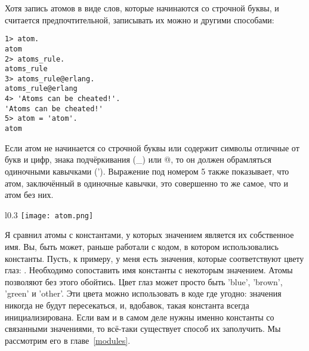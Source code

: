 Хотя запись атомов в виде слов, которые начинаются со строчной буквы, и считается предпочтительной, записывать их можно и другими способами:
\begin{lstlisting}[style=repl]
1> atom.
atom
2> atoms_rule.
atoms_rule
3> atoms_rule@erlang.
atoms_rule@erlang
4> 'Atoms can be cheated!'.
'Atoms can be cheated!'
5> atom = 'atom'.
atom
\end{lstlisting}

Если атом не начинается со строчной буквы или содержит символы отличные от букв и цифр, знака подчёркивания (\_) или @, то он должен обрамляться одиночными кавычками (').
Выражение под номером 5 также показывает, что атом, заключённый в одиночные кавычки, это совершенно то же самое, что и атом без них.

\begin{wrapfigure}{l}{0.3\linewidth}
    \texttt{[image: atom.png]}
\end{wrapfigure}
Я сравнил атомы с константами, у которых значением является их собственное имя.
Вы, быть может, раньше работали с кодом, в котором использовались константы.
Пусть, к примеру, у меня есть значения, которые соответствуют цвету глаз:  .
Необходимо сопоставить имя константы с некоторым значением.
Атомы позволяют без этого обойтись.
Цвет глаз может просто быть 'blue', 'brown', 'green' и 'other'.
Эти цвета можно использовать в коде где угодно: значения никогда не будут пересекаться, и, вдобавок, такая константа всегда инициализирована.
Если вам и в самом деле нужны именно константы со связанными значениями, то всё\--таки существует способ их заполучить.
Мы рассмотрим его в главе~\ref{modules}.


